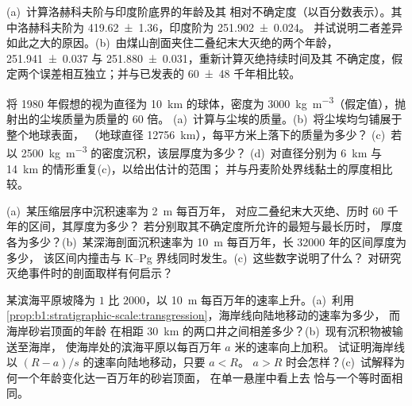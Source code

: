 \begin{exercise}[$\star\star$]\label{exo:b1:stratigraphic-scale:7}
(a)~计算洛赫科夫阶与印度阶底界的年龄及其
相对不确定度（以百分数表示）。其中洛赫科夫阶为 \qty[uncertainty-mode=separate]{419.62(136)}{\Ma}，印度阶为 \qty[uncertainty-mode=separate]{251.902(24)}{\Ma}。
并试说明二者差异如此之大的原因。(b)~由煤山剖面夹住二叠纪末大灭绝的两个年龄，
\qty[uncertainty-mode=separate]{251.941(37)}{\Ma} 与
\qty[uncertainty-mode=separate]{251.880(31)}{\Ma}，重新计算灭绝持续时间及其
不确定度，假定两个误差相互独立；并与已发表的
\num[uncertainty-mode=separate]{60 \pm 48} 千年相比较。
\end{exercise}

\begin{exercise}[$\star\star$]\label{exo:b1:stratigraphic-scale:8}
将 1980 年假想的视为直径为 \qty{10}{km} 的球体，密度为
\qty{3000}{kg.m^{-3}}（假定值），抛射出的尘埃质量为质量的 60 倍。
(a)~计算与尘埃的质量。(b)~将尘埃均匀铺展于整个地球表面，
（地球直径 \qty{12756}{km}），每平方米上落下的质量为多少？
(c)~若以 \qty{2500}{kg.m^{-3}} 的密度沉积，该层厚度为多少？
(d)~对直径分别为 \qty{6}{km} 与 \qty{14}{km} 的情形重复(c)，以给出估计的范围；
并与丹麦阶处界线黏土的厚度相比较。
\end{exercise}

\begin{exercise}[$\star\star$]\label{exo:b1:stratigraphic-scale:9}
(a)~某压缩层序中沉积速率为 \qty{2}{m} 每百万年，
对应二叠纪末大灭绝、历时 \num{60} 千年的区间，其厚度为多少？
若分别取其不确定度所允许的最短与最长历时，
厚度各为多少？(b)~某深海剖面沉积速率为
\qty{10}{m} 每百万年，长 \num{32000} 年的区间厚度为多少，
该区间内撞击与 K--Pg 界线同时发生。(c)~这些数字说明了什么？
对研究灭绝事件时的剖面取样有何启示？
\end{exercise}

\begin{exercise}[$\star\star\star$]\label{exo:b1:stratigraphic-scale:10}
某滨海平原坡降为 $1$ 比 $2000$，以
\qty{10}{m} 每百万年的速率上升。(a)~利用
\cref{prop:b1:stratigraphic-scale:transgression}，海岸线向陆地移动的速率为多少，
而海岸砂岩顶面的年龄
在相距 \qty{30}{km} 的两口井之间相差多少？(b)~现有沉积物被输送至海岸，
使海岸处的滨海平原以每百万年 $a$ 米的速率向上加积。
试证明海岸线以 $(R - a)/s$ 的速率向陆地移动，只要 $a < R$。
$a > R$ 时会怎样？(c)~试解释为何一个年龄变化达一百万年的砂岩顶面，
在单一悬崖中看上去
恰与一个等时面相同。
\end{exercise}

